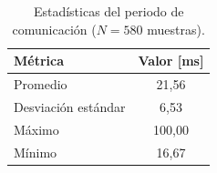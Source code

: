 \begin{table}[htbp]
    \centering
    \caption{Estadísticas del periodo de comunicación ($N = 580$ muestras).}
    \label{tab:periodo_comms}
    \begin{tabular}{lc}
        \hline
        \textbf{Métrica} & \textbf{Valor [ms]} \\
        \hline
        Promedio            & 21,56 \\
        Desviación estándar & 6,53 \\
        Máximo              & 100,00 \\
        Mínimo              & 16,67 \\
        \hline
    \end{tabular}
\end{table}
